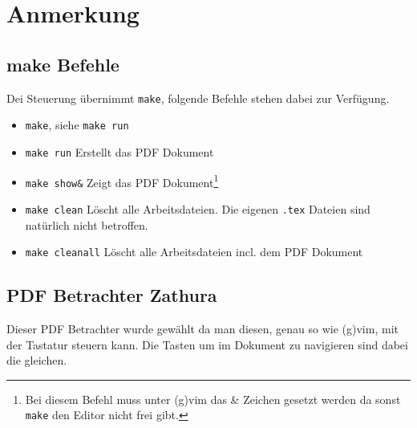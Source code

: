 \section{Anmerkung}
\label{sec:anmerkung}


\subsection{make Befehle}
\label{ssec:make_befehle}

\todo

Dei Steuerung übernimmt \verb!make!, folgende Befehle stehen
dabei zur Verfügung.

\begin{itemize}
	\item \verb!make!, siehe \verb!make run!
	\item \verb!make run!      \hspace{1em} Erstellt das PDF Dokument
	\item \verb!make show&!    \hspace{1em} Zeigt das PDF
		Dokument\footnote{Bei diesem Befehl muss unter (g)vim das \& Zeichen
	gesetzt werden da sonst \texttt{make} den Editor nicht frei gibt.}
	\item \verb!make clean!    \hspace{1em} Löscht alle Arbeitsdateien. Die
		eigenen \texttt{.tex} Dateien sind natürlich nicht betroffen.
	\item \verb!make cleanall! \hspace{1em} Löscht alle Arbeitsdateien incl.
		dem PDF Dokument
\end{itemize}




\subsection{PDF Betrachter Zathura}
\label{ssec:zathura}

Dieser PDF Betrachter wurde gewählt da man diesen,
genau so wie (g)vim,
mit der Tastatur steuern kann.
Die Tasten um im Dokument zu navigieren sind dabei die gleichen.
